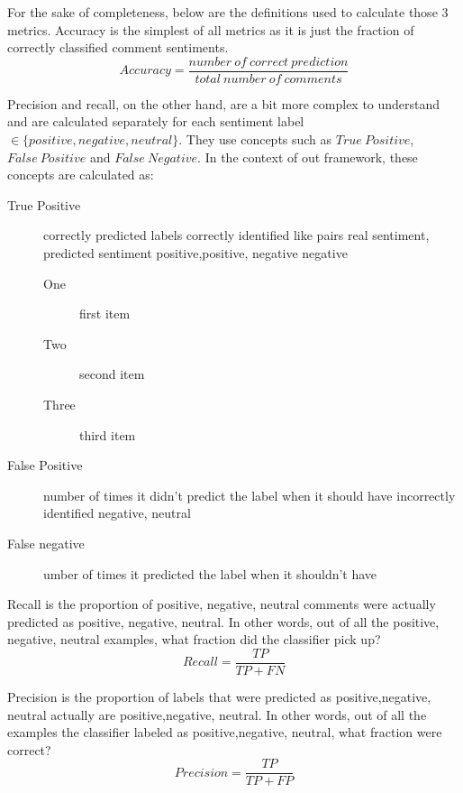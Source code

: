 For the sake of completeness, below are the definitions used to calculate those 3 metrics.
Accuracy is the simplest of all metrics as it is just the fraction of correctly classified comment sentiments.
\[Accuracy = \frac{number\ of\ correct\ prediction}{total\ number \ of\ comments}\]

Precision and recall, on the other hand, are a bit more complex to understand and are calculated separately for each sentiment label $ \in \{ positive, negative, neutral \}$. 
They use concepts such as $True\ Positive$, $False\ Positive$  and $False\ Negative$.
In the context of out framework, these concepts are calculated as:
\begin{description}
 \item[True Positive] 
 correctly predicted labels
correctly identified like pairs {real sentiment, predicted sentiment} 
 {positive,positive}, {negative negative}
 \begin{description}
 \item[One] first item
 \item[Two] second item
 \item[Three] third item
\end{description}

 \item[False Positive]  
 number of times it didn't predict the label when it should have
 incorrectly identified {negative, neutral}
 \item[False negative] 
 umber of times it predicted the label when it shouldn't have 
\end{description}

Recall is the proportion of {positive, negative, neutral} comments were actually predicted as {positive, negative, neutral}. In other words, out of all the {positive, negative, neutral} examples, what fraction did the classifier pick up?
\[Recall = \frac{TP}{TP + FN }\]


Precision is the proportion of labels that were predicted as {positive,negative, neutral} actually are {positive,negative, neutral}. In other words, out of all the examples the classifier labeled as {positive,negative, neutral}, what fraction were correct?
\[Precision = \frac{TP}{TP + FP }\]